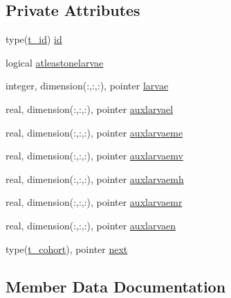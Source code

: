 \subsection*{Private Attributes}
\begin{DoxyCompactItemize}
\item 
type(\mbox{\hyperlink{structmodulewaterproperties_1_1t__id}{t\+\_\+id}}) \mbox{\hyperlink{structmodulewaterproperties_1_1t__cohort_a61b88b4e9e7e88c582fe0b45a350bb59}{id}}
\item 
logical \mbox{\hyperlink{structmodulewaterproperties_1_1t__cohort_a6074d15fd711019f8169fea216629e38}{atleastonelarvae}}
\item 
integer, dimension(\+:,\+:,\+:), pointer \mbox{\hyperlink{structmodulewaterproperties_1_1t__cohort_a6bae82409568a75372c6dc3bd5b8f521}{larvae}}
\item 
real, dimension(\+:,\+:,\+:), pointer \mbox{\hyperlink{structmodulewaterproperties_1_1t__cohort_a81c1e812e1a4e57f68a7b57b29e5555e}{auxlarvael}}
\item 
real, dimension(\+:,\+:,\+:), pointer \mbox{\hyperlink{structmodulewaterproperties_1_1t__cohort_ae24b3cc4e8592fbad1169d9db3082149}{auxlarvaeme}}
\item 
real, dimension(\+:,\+:,\+:), pointer \mbox{\hyperlink{structmodulewaterproperties_1_1t__cohort_ae157765055bfddd6678cfb9fc41b3162}{auxlarvaemv}}
\item 
real, dimension(\+:,\+:,\+:), pointer \mbox{\hyperlink{structmodulewaterproperties_1_1t__cohort_a656a9cd6b76fdc51d0afdb1ae5e50dfd}{auxlarvaemh}}
\item 
real, dimension(\+:,\+:,\+:), pointer \mbox{\hyperlink{structmodulewaterproperties_1_1t__cohort_a980ba2637dd1ae0c149fe9ca41ed9273}{auxlarvaemr}}
\item 
real, dimension(\+:,\+:,\+:), pointer \mbox{\hyperlink{structmodulewaterproperties_1_1t__cohort_a0d03b084616441c46a2733670bab2a0a}{auxlarvaen}}
\item 
type(\mbox{\hyperlink{structmodulewaterproperties_1_1t__cohort}{t\+\_\+cohort}}), pointer \mbox{\hyperlink{structmodulewaterproperties_1_1t__cohort_a9bd8936e14787c0c2354cfbd51a420ea}{next}}
\end{DoxyCompactItemize}


\subsection{Member Data Documentation}
\mbox{\label{structmodulewaterproperties_1_1t__cohort_a6074d15fd711019f8169fea216629e38}} 
